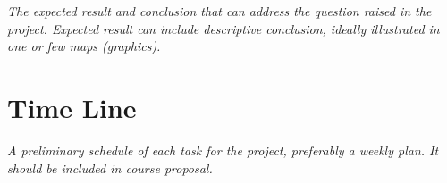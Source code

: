 \documentclass[11pt]{article}
\begin{document}
\textit{The expected result and conclusion that can address the question raised in the project. Expected result can include descriptive conclusion, ideally illustrated in one or few maps (graphics).}

\section{Time Line}

\textit{A preliminary schedule of each task for the project, preferably a weekly plan. It should be included in course proposal.}

\printbibliography
\end{document}
